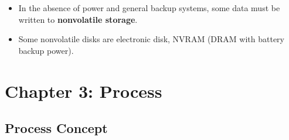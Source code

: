 \documentclass[10pt]{article}
\begin{document}
\begin{enumerate}
\begin{itemize}
		\bigbreak
		\bigbreak

		\item In the absence of power and general backup systems, some data must be written to \textbf{nonvolatile storage}.
		\item Some nonvolatile disks are electronic disk, NVRAM (DRAM with battery backup power).
	\end{itemize}

\end{enumerate}

\pagebreak
\section*{Chapter 3: Process}

\subsection*{Process Concept}
\end{document}
